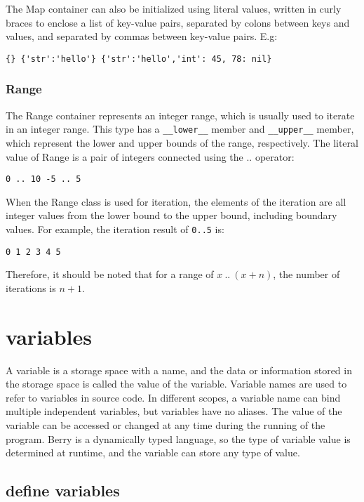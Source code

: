 The Map container can also be initialized using literal values, written in curly braces to enclose a list of key-value pairs, separated by colons between keys and values, and separated by commas between key-value pairs. E.g:
\begin{lstlisting}[language=berry, numbers=none]
{} {'str':'hello'} {'str':'hello','int': 45, 78: nil}
\end{lstlisting}

\subsubsection{Range}

The Range container represents an integer range, which is usually used to iterate in an integer range. This type has a \texttt{\_\_lower\_\_} member and \texttt{\_\_upper\_\_} member, which represent the lower and upper bounds of the range, respectively. The literal value of Range is a pair of integers connected using the .. operator:
\begin{lstlisting}[language=berry, numbers=none]
0 .. 10 -5 .. 5
\end{lstlisting}

When the Range class is used for iteration, the elements of the iteration are all integer values   from the lower bound to the upper bound, including boundary values. For example, the iteration result of \texttt{0..5} is:
\begin{lstlisting}[language=berry, numbers=none]
0 1 2 3 4 5
\end{lstlisting}
Therefore, it should be noted that for a range of $x\ ..\ (x+n)$, the number of iterations is $n+1$.

\section {variables}A variable is a storage space with a name, and the data or information stored in the storage space is called the value of the variable. Variable names are used to refer to variables in source code. In different scopes, a variable name can bind multiple independent variables, but variables have no aliases. The value of the variable can be accessed or changed at any time during the running of the program. Berry is a dynamically typed language, so the type of variable value is determined at runtime, and the variable can store any type of value.

\subsection {define variables}

